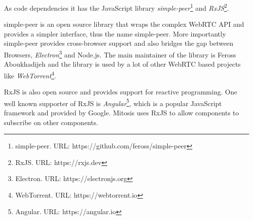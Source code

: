 As code dependencies it has the JavaScript library \textit{simple-peer}\footnote{simple-peer. URL: {https://github.com/feross/simple-peer}} and \textit{RxJS}\footnote{RxJS. URL: {https://rxjs.dev}}. 

simple-peer is an open source library that wraps the complex WebRTC API and provides a simpler interface, thus the name simple-peer. More importantly simple-peer provides cross-browser support and also bridges the gap between Browsers, \textit{Electron}\footnote{Electron. URL: {https://electronjs.org}} and Node.js.
The main maintainer of the library is Feross Aboukhadijeh and the library is used by a lot of other WebRTC based projects like \textit{WebTorrent}\footnote{WebTorrent. URL: {https://webtorrent.io}}.

RxJS is also open source and provides support for reactive programming. One well known supporter of RxJS is \textit{Angular}\footnote{Angular. URL: {https://angular.io}}, which is a popular JavaScript framework and provided by Google.
Mitosis uses RxJS to allow components to subscribe on other components.



